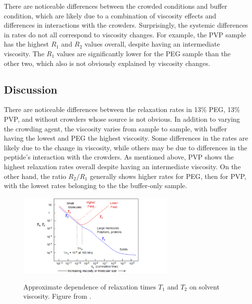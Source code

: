 There are noticeable differences between the crowded conditions and buffer condition, which are likely due to a combination of viscosity effects and differences in interactions with the crowders.  Surprisingly, the systemic differences in rates do not all correspond to viscosity changes.  For example, the PVP sample has the highest $R_1$ and $R_2$ values overall, despite having an intermediate viscosity.  The $R_1$ values are significantly lower for the PEG sample than the other two, which also is not obviously explained by viscosity changes.

\subsection{Discussion}

There are noticeable differences between the relaxation rates in 13\% PEG, 13\% PVP, and without crowders whose source is not obvious.  In addition to varying the crowding agent, the viscosity varies from sample to sample, with buffer having the lowest and PEG the highest viscosity.  Some differences in the rates are likely due to the change in viscosity, while others may be due to differences in the peptide's interaction with the crowders.  As mentioned above, PVP shows the highest relaxation rates overall despite having an intermediate viscosity.  On the other hand, the ratio $R_2/R_1$ generally shows higher rates for PEG, then for PVP, with the lowest rates belonging to the the buffer-only sample.

\begin{figure}
\caption[Approximate dependence of relaxation times on viscosity.]{Approximate dependence of relaxation times $T_1$ and $T_2$ on solvent viscosity. Figure from \cite{reich18}.}
\centering
\includegraphics[width=0.7\textwidth]{figs/ch05/viscosity-plot}
\label{fig:viscosity}
\end{figure}

